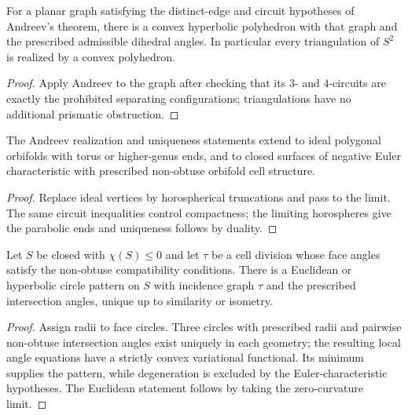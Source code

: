 \begin{corollary}
\label{thurston-ch13-planar-graph-realization}

For a planar graph satisfying the distinct-edge and circuit hypotheses of
Andreev's theorem, there is a convex hyperbolic polyhedron with that graph and
the prescribed admissible dihedral angles.  In particular every triangulation
of $S^2$ is realized by a convex polyhedron.
\end{corollary}
\begin{proof}
\sketch Apply Andreev to the graph after checking that its $3$- and $4$-circuits
are exactly the prohibited separating configurations; triangulations have no
additional prismatic obstruction.
\end{proof}

\begin{theorem}
\label{thurston-ch13-cusped-realization}

The Andreev realization and uniqueness statements extend to ideal polygonal
orbifolds with torus or higher-genus ends, and to closed surfaces of negative
Euler characteristic with prescribed non-obtuse orbifold cell structure.
\end{theorem}
\begin{proof}
\sketch Replace ideal vertices by horospherical truncations and pass to the
limit.  The same circuit inequalities control compactness; the limiting
horospheres give the parabolic ends and uniqueness follows by duality.
\end{proof}

\begin{theorem}
\label{thurston-ch13-circle-pattern}

Let $S$ be closed with $\chi(S)\leq0$ and let $\tau$ be a cell division whose
face angles satisfy the non-obtuse compatibility conditions.  There is a
Euclidean or hyperbolic circle pattern on $S$ with incidence graph $\tau$ and
the prescribed intersection angles, unique up to similarity or isometry.
\end{theorem}
\begin{proof}
\sketch Assign radii to face circles.  Three circles with prescribed radii and
pairwise non-obtuse intersection angles exist uniquely in each geometry; the
resulting local angle equations have a strictly convex variational functional.
Its minimum supplies the pattern, while degeneration is excluded by the
Euler-characteristic hypotheses.  The Euclidean statement follows by taking
the zero-curvature limit.
\end{proof}

